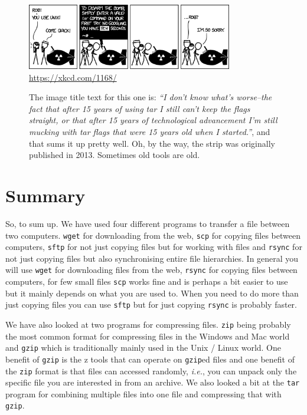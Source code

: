 \documentclass[watermark]{pbpreprint}
\begin{document}
\begin{figure}[bht]
    \centering
    \includegraphics[width=0.8\textwidth]{Figures/xkcd_tar.png}\\
    \url{https://xkcd.com/1168/}
    \caption{The image title text for this one is: \textit{``I don't know
    what's worse--the fact that after 15 years of using tar I still can't keep
    the flags straight, or that after 15 years of technological advancement I'm
    still mucking with tar flags that were 15 years old when I started.''}, and
    that sums it up pretty well. Oh, by the way, the strip was originally
    published in 2013. Sometimes old tools are old.\label{xkcdtar}}
\end{figure}

\section{Summary}
So, to sum up. We have used four different programs to transfer a file between
two computers. \texttt{wget} for downloading from the web,  \texttt{scp} for
copying files between computers, \texttt{sftp} for not just copying files but
for working with files and \texttt{rsync} for not just copying files but also
synchronising entire file hierarchies. In general you will use \texttt{wget}
for downloading files from the web, \texttt{rsync} for copying files between
computers, for few small files \texttt{scp} works fine and is perhaps a bit
easier to use but it mainly depends on what you are used to. When you need to
do more than just copying files you can use \texttt{sftp} but for just copying
\texttt{rsync} is probably faster.

We have also looked at two programs for compressing files. \texttt{zip} being
probably the most common format for compressing files in the Windows and Mac
world and \texttt{gzip} which is traditionally mainly used in the Unix / Linux
world. One benefit of \texttt{gzip} is the z tools that can operate on
\texttt{gzip}ed files and one benefit of the \texttt{zip} format is that files
can accessed randomly, \textit{i.e.}, you can unpack only the specific file you
are interested in from an archive. We also looked a bit at the \texttt{tar}
program for combining multiple files into one file and compressing that with
\texttt{gzip}.
\end{document}
